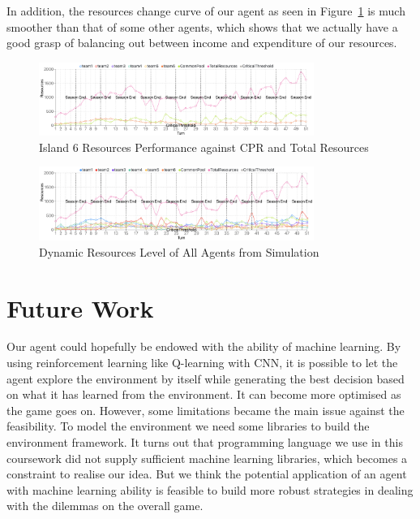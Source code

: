 In addition, the resources change curve of our agent as seen in Figure~\ref{fig:team 6} is much smoother than that of some other agents, which shows that we actually have a good grasp of balancing out between income and expenditure of our resources. \\
\begin{figure}[H]
    \centering
    \includegraphics[width=0.8\textwidth]{14_team6_agentdesign/images/resources 1.png}
    \caption{Island 6 Resources Performance against CPR and Total Resources}
    \label{fig:team 6}
\end{figure}
\begin{figure}[H]
    \centering
    \includegraphics[width=0.8\textwidth]{14_team6_agentdesign/images/resources 2.png}
    \caption{Dynamic Resources Level of All Agents from Simulation}
    \label{fig:all teams}
\end{figure}

\section{Future Work} \label{sec:Team6_Future}
Our agent could hopefully be endowed with the ability of machine learning. By using reinforcement learning like Q-learning with CNN, it is possible to let the agent explore the environment by itself while generating the best decision based on what it has learned from the environment. It can become more optimised as the game goes on. However, some limitations became the main issue against the feasibility. To model the environment we need some libraries to build the environment framework. It turns out that programming language we use in this coursework did not supply sufficient machine learning libraries, which becomes a constraint to realise our idea. But we think the potential application of an agent with machine learning ability is feasible to build more robust strategies in dealing with the dilemmas on the overall game.